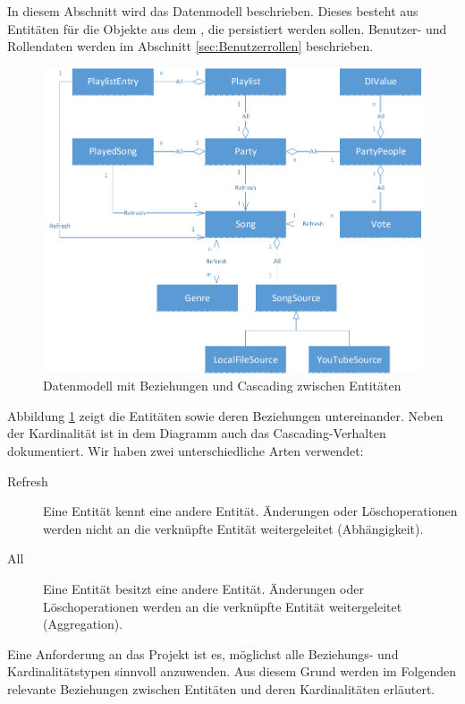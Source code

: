 In diesem Abschnitt wird das Datenmodell beschrieben. Dieses besteht aus Entitäten für die Objekte aus dem , die persistiert werden sollen. Benutzer- und Rollendaten werden im Abschnitt \ref{sec:Benutzerrollen} beschrieben.

\begin{figure}[htb]
\centering
\includegraphics[width=1\linewidth]{Bilder/Datenmodell}
\caption{Datenmodell mit Beziehungen und Cascading zwischen Entitäten}
\label{fig:Datenmodell}
\end{figure}

Abbildung \ref{fig:Datenmodell} zeigt die Entitäten sowie deren Beziehungen untereinander. Neben der Kardinalität ist in dem Diagramm auch das Cascading-Verhalten dokumentiert. Wir haben zwei unterschiedliche Arten verwendet:
\begin{description}
	\item[Refresh] Eine Entität kennt eine andere Entität. Änderungen oder Löschoperationen werden nicht an die verknüpfte Entität weitergeleitet (Abhängigkeit).
	\item[All] Eine Entität besitzt eine andere Entität. 
	Änderungen oder Löschoperationen werden an die 
	verknüpfte Entität weitergeleitet (Aggregation).
\end{description}

Eine Anforderung an das Projekt ist es, möglichst alle Beziehungs- und Kardinalitätstypen sinnvoll anzuwenden. Aus diesem Grund werden im Folgenden relevante Beziehungen zwischen Entitäten und deren Kardinalitäten erläutert.

